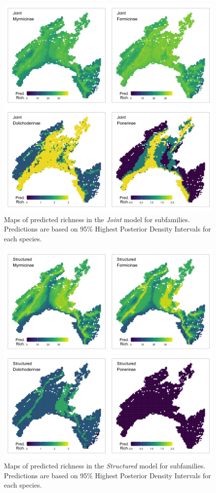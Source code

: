 \documentclass[preprint,review,times,12pt]{elsarticle}
\begin{document}
\begin{figure}
	\centering\includegraphics[width=5in]{ms/1_Ecography/1/figs/maps/sf_S_WY.png}
	\caption{\label{fig:sf_map_Joint} Maps of predicted richness in the \emph{Joint} model for subfamilies. Predictions are based on 95\% Highest Posterior Density Intervals for each species. }
\end{figure}

\begin{figure}
	\centering\includegraphics[width=5in]{ms/1_Ecography/1/figs/maps/sf_S_Y.png}
	\caption{\label{fig:sf_map_Structured} Maps of predicted richness in the \emph{Structured} model for subfamilies. Predictions are based on 95\% Highest Posterior Density Intervals for each species. }
\end{figure}
\end{document}
